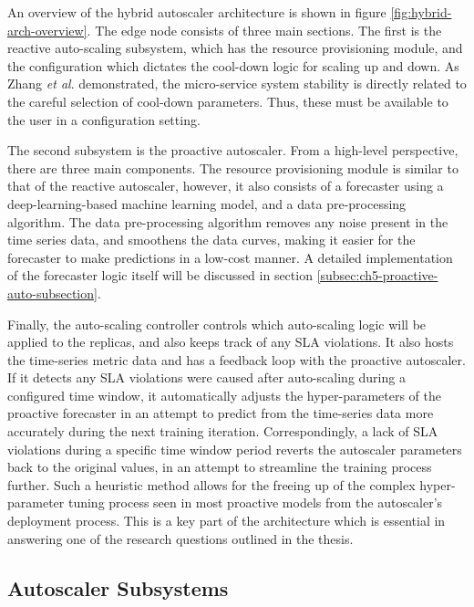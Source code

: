 An overview of the hybrid autoscaler architecture is shown in figure \ref{fig:hybrid-arch-overview}. The edge node consists of three main sections. The first is the reactive auto-scaling subsystem, which has the resource provisioning module, and the configuration which dictates the cool-down logic for scaling up and down. As Zhang \textit{et al}. \cite{zhang2019quantifying} demonstrated, the micro-service system stability is directly related to the careful selection of cool-down parameters. Thus, these must be available to the user in a configuration setting.\par

The second subsystem is the proactive autoscaler. From a high-level perspective, there are three main components. The resource provisioning module is similar to that of the reactive autoscaler, however, it also consists of a forecaster using a deep-learning-based machine learning model, and a data pre-processing algorithm. The data pre-processing algorithm removes any noise present in the time series data, and smoothens the data curves, making it easier for the forecaster to make predictions in a low-cost manner. A detailed implementation of the forecaster logic itself will be discussed in section \ref{subsec:ch5-proactive-auto-subsection}.\par

Finally, the auto-scaling controller controls which auto-scaling logic will be applied to the replicas, and also keeps track of any SLA violations. It also hosts the time-series metric data and has a feedback loop with the proactive autoscaler. If it detects any SLA violations were caused after auto-scaling during a configured time window, it automatically adjusts the hyper-parameters of the proactive forecaster in an attempt to predict from the time-series data more accurately during the next training iteration. Correspondingly, a lack of SLA violations during a specific time window period reverts the autoscaler parameters back to the original values, in an attempt to streamline the training process further. Such a heuristic method allows for the freeing up of the complex hyper-parameter tuning process seen in most proactive models from the autoscaler's deployment process. This is a key part of the architecture which is essential in answering one of the research questions outlined in the thesis.\par


\subsection{Autoscaler Subsystems}
\label{subsec:ch4-hybrid-arch}


